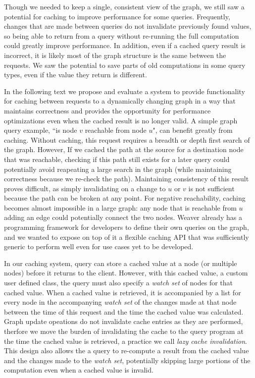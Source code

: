 \documentclass[letterpaper,twocolumn,11pt,tight]{article}
\begin{document}
Though we needed to keep a single, consistent view of the graph, we still saw a potential for caching to improve performance for some queries. Frequently, changes that are made between queries do not invalidate previously found values, so being able to return from a query without re-running the full computation could greatly improve performance.
In addition, even if a cached query result is incorrect, it is likely most of the graph structure is the same between the requests.
We saw the potential to save parts of old computations in some query types, even if the value they return is different.

In the following text we propose and evaluate a system to provide functionality for caching between requests to a dynamically changing graph in a way that maintains correctness and provides the opportunity for performance optimizations even when the cached result is no longer valid.
A simple graph query example, ``is node $v$ reachable from node $u$", can benefit greatly from caching.
Without caching, this request requires a breadth or depth first search of the graph.
However, If we cached the path at the source for a destination node that was reachable, checking if this path still exists for a later query could potentially avoid reapeating a large search in the graph (while maintaining correctness because we re-check the path).
Maintaining consistency of this result proves difficult, as simply invalidating on a change to $u$ or $v$ is not sufficient because the path can be broken at any point.
For negative reachability, caching becomes almost impossible in a large graph: any node that is reachable from $u$ adding an edge could potentially connect the two nodes.
Weaver already has a programming framework for developers to define their own queries on the graph, and we wanted to expose on top of it a flexible caching API that was sufficiently generic to perform well even for use cases yet to be developed.

In our caching system, query can store a cached value at a node (or multiple nodes) before it returns to the client. However, with this cached value, a custom user defined class, the query must also specify a \emph{watch set} of nodes for that cached value.
When a cached value is retrieved, it is accompanied by a list for every node in the accompanying \emph{watch set} of the changes made at that node between the time of this request and the time the cached value was calculated.
Graph update opeations do not invalidate cache entries as they are performed, therfore we move the burden of invalidating the cache to the query program at the time the cached value is retrieved, a practice we call \emph{lazy cache invalidation}.
This design also allows the a query to re-compute a result from the cached value and the changes made to the \emph{watch set}, potentially skipping large portions of the computation even when a cached value is invalid.
\end{document}
